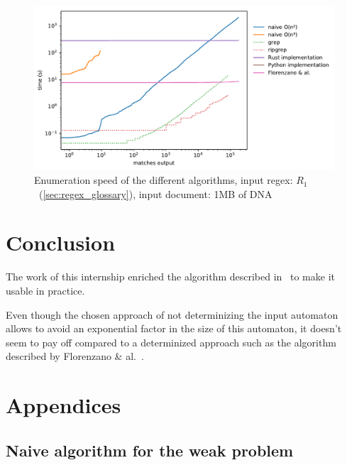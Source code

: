 \documentclass[12px]{article}
\theoremstyle{definition}
\begin{document}
      \begin{figure}%
        \label{fig:bench}
        \caption{
          Enumeration speed of the different algorithms, input regex:
          $R_1$~(\ref{sec:regex_glossary}), input document: 1MB of DNA
        }
        \center\includegraphics[width=5in]{figures/bench}
      \end{figure}



  \section{Conclusion}

    The work of this internship enriched the algorithm described
    in~\cite{ICDT19} to make it usable in practice.

    Even though the chosen approach of not determinizing the input automaton
    allows to avoid an exponential factor in the size of this automaton, it
    doesn't seem to pay off compared to a determinized approach such as the
    algorithm described by Florenzano \& al.~\cite{florenzano2018constant}.

  \pagebreak
  
  


  \pagebreak
  \section*{Appendices}


    \subsection{Naive algorithm for the weak problem}
\end{document}
